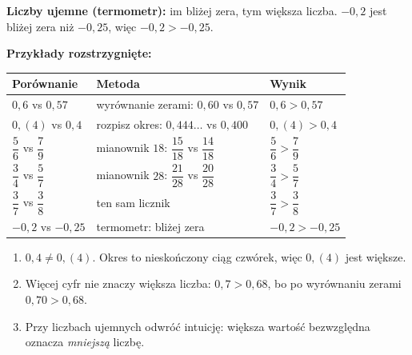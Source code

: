 \documentclass[11pt,a4paper]{article}
\begin{document}
\vspace{0.2em}
\textbf{Liczby ujemne (termometr):} im bliżej zera, tym większa liczba. $-0{,}2$ jest bliżej zera niż $-0{,}25$, więc $-0{,}2>-0{,}25$.

\vspace{0.2em}
\textbf{Przykłady rozstrzygnięte:}
\begin{center}
\renewcommand{\arraystretch}{1.6}
\begin{tabular}{@{}lll@{}}
\toprule
Porównanie & Metoda & Wynik \\
\midrule
$0{,}6$ vs $0{,}57$ & wyrównanie zerami: $0{,}60$ vs $0{,}57$ & $0{,}6>0{,}57$ \\
$0{,}(4)$ vs $0{,}4$ & rozpisz okres: $0{,}444\ldots$ vs $0{,}400$ & $0{,}(4)>0{,}4$ \\[2pt]
$\dfrac{5}{6}$ vs $\dfrac{7}{9}$ & mianownik $18$: $\dfrac{15}{18}$ vs $\dfrac{14}{18}$ & $\dfrac{5}{6}>\dfrac{7}{9}$ \\[6pt]
$\dfrac{3}{4}$ vs $\dfrac{5}{7}$ & mianownik $28$: $\dfrac{21}{28}$ vs $\dfrac{20}{28}$ & $\dfrac{3}{4}>\dfrac{5}{7}$ \\[6pt]
$\dfrac{3}{7}$ vs $\dfrac{3}{8}$ & ten sam licznik & $\dfrac{3}{7}>\dfrac{3}{8}$ \\[6pt]
$-0{,}2$ vs $-0{,}25$ & termometr: bliżej zera & $-0{,}2>-0{,}25$ \\
\bottomrule
\end{tabular}
\end{center}

\begin{pulapka}
\begin{enumerate}[leftmargin=*, itemsep=2pt]
  \item $0{,}4\neq 0{,}(4)$. Okres to nieskończony ciąg czwórek, więc $0{,}(4)$ jest większe.
  \item Więcej cyfr nie znaczy większa liczba: $0{,}7>0{,}68$, bo po wyrównaniu zerami $0{,}70>0{,}68$.
  \item Przy liczbach ujemnych odwróć intuicję: większa wartość bezwzględna oznacza \emph{mniejszą} liczbę.
\end{enumerate}
\end{pulapka}
\end{document}
